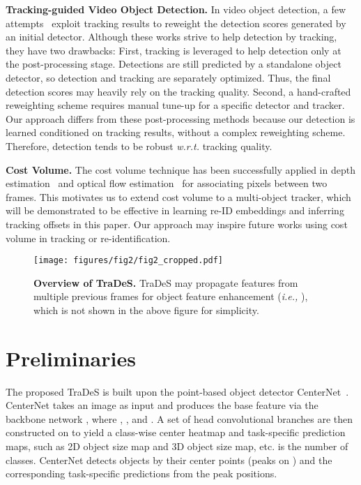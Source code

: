 \documentclass[final]{cvpr}
\newcommand{\myparagraph}[1]{{\vspace{0.5em} \noindent \bf #1}}
\begin{document}
\myparagraph{Tracking-guided Video Object Detection.} In video object detection, a few attempts~\cite{feichtenhofer2017detect,zhang2018integrated} exploit tracking results to reweight the detection scores generated by an initial detector. Although these works strive to help detection by tracking, they have two drawbacks: First, tracking is leveraged to help detection only at the post-processing stage. Detections are still predicted by a standalone object detector, so detection and tracking are separately optimized. Thus, the final detection scores may heavily rely on the tracking quality. Second, a hand-crafted reweighting scheme requires manual tune-up for a specific detector and tracker. Our approach differs from these post-processing methods because our detection is learned conditioned on tracking results, without a complex reweighting scheme. Therefore, detection tends to be robust \emph{w.r.t.} tracking quality. 

\myparagraph{Cost Volume.} The cost volume technique has been successfully applied in depth estimation~\cite{collins1996space,yang2020cost,im2019dpsnet} and optical flow estimation~\cite{sun2018pwc,chen2016full,xu2017accurate} for associating pixels between two frames. This motivates us to extend cost volume to a multi-object tracker, which will be demonstrated to be effective in learning re-ID embeddings and inferring tracking offsets in this paper. Our approach may inspire future works using cost volume in tracking or re-identification.

\begin{figure*}
	\centering
	\texttt{[image: figures/fig2/fig2\_cropped.pdf]}
	\caption{\textbf{Overview of TraDeS.} TraDeS may propagate features from multiple previous frames for object feature enhancement (\emph{i.e.,} ), which is not shown in the above figure for simplicity.}
	\label{fig:overview}
	\vspace{-2mm}
\end{figure*}

\section{Preliminaries}
\label{sec:preliminaries}
The proposed TraDeS is built upon the point-based object detector CenterNet~\cite{zhou2019objects}. CenterNet takes an image  as input and produces the base feature  via the backbone network , where , , and . A set of head convolutional branches are then constructed on  to yield a class-wise center heatmap  and task-specific prediction maps, such as 2D object size map and 3D object size map, etc.  is the number of classes. CenterNet detects objects by their center points (peaks on ) and the corresponding task-specific predictions from the peak positions. 
\end{document}
